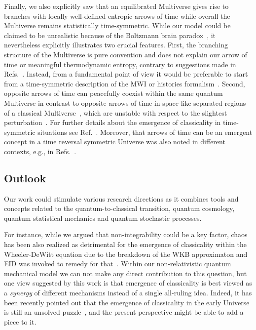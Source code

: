 \documentclass[pre,twocolumn,10pt,aps,longbibliography,nofootinbib]{revtex4-1}
\newcommand{\blue}[1]{#1}
\begin{document}
\blue{Finally, we also explicitly saw that an equilibrated Multiverse gives rise to branches with locally well-defined entropic arrows of time while overall the Multiverse remains statistically time-symmetric. While our model could be claimed to be unrealistic because of the Boltzmann brain paradox~\cite{AlbrechtSorboPRD2004, CarrollInBook2020, MuellerQuantum2020}, it nevertheless explicitly illustrates two crucial features. First, the branching structure of the Multiverse is pure convention and does not explain our arrow of time or meaningful thermodynamic entropy, contrary to suggestions made in Refs.~\cite{DeutschInBook2010, Aaronson2013}. Instead, from a fundamental point of view it would be preferable to start from a time-symmetric description of the MWI or histories formalism~\cite{AharonovBergmannLebowitzPR1964, IshamJMP1994, IshamLindenPRA1997, GriffithsBook2002, VaidmanInBook2010}. Second, opposite arrows of time can peacefully coexist within the same quantum Multiverse in contrast to opposite arrows of time in space-like separated regions of a classical Multiverse~\cite{SchulmanPRL1999}, which are unstable with respect to the slightest perturbation~\cite{KupervasserNikolicZlaticFP2012}. For further details about the emergence of classicality in time-symmetric situations see Ref.~\cite{AlbrechtBaunachArrasmithPRD2022}. Moreover, that arrows of time can be an emergent concept in a time reversal symmetric Universe was also noted in different contexts, e.g., in Refs.~\cite{SchulmanPRL1999, CarrollChenArXiv2004, BarbourKoslowskiMercatiPRL2014, DeutschAguirreFP2022}.}

\subsection{\blue{Outlook}}

\blue{Our work could stimulate various research directions as it combines tools and concepts related to the quantum-to-classical transition, quantum cosmology, quantum statistical mechanics and quantum stochastic processes.}

\blue{For instance, while we argued that non-integrability could be a key factor,} chaos has been also realized as detrimental for the emergence of classicality within the Wheeler-DeWitt equation due to the breakdown of the WKB approximaton and EID was invoked to remedy for that~\cite{CalzettaGonzalezPRD1995, CornishShellardPRL1998, CalzettaCQG2012}. Within our non-relativistic quantum mechanical model we can not make any direct contribution to this question, but one view suggested by this work is that emergence of classicality is best viewed as a \emph{synergy} of different mechanisms instead of a single all-ruling idea. Indeed, it has been recently pointed out that the emergence of classicality in the early Universe is still an unsolved puzzle~\cite{BerjonOkonSudarskyPRD2021}, and the present perspective might be able to add a piece to it.
\end{document}
